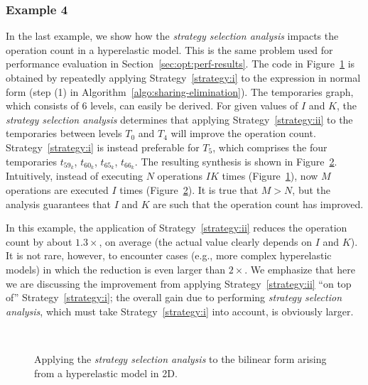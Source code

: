 \subsubsection{Example 4}
In the last example, we show how the {\em strategy selection analysis} impacts the operation count in a hyperelastic model. This is the same problem used for performance evaluation in Section~\ref{sec:opt:perf-results}. The code in Figure~\ref{code:hyper_a} is obtained by repeatedly applying Strategy~\ref{strategy:i} to the expression in normal form (step (1) in Algorithm~\ref{algo:sharing-elimination}). The temporaries graph, which consists of 6 levels, can easily be derived. For given values of $I$ and $K$, the {\em strategy selection analysis} determines that applying Strategy~\ref{strategy:ii} to the temporaries between levels $T_0$ and $T_4$ will improve the operation count. Strategy~\ref{strategy:i} is instead preferable for $T_5$, which comprises the four temporaries $t_{59_k}$, $t_{60_k}$, $t_{65_k}$, $t_{66_k}$. The resulting synthesis is shown in Figure~\ref{code:hyper_b}. Intuitively, instead of executing $N$ operations $I K$ times (Figure~\ref{code:hyper_a}), now $M$ operations are executed $I$ times (Figure~\ref{code:hyper_b}). It is true that $M > N$, but the analysis guarantees that $I$ and $K$ are such that the operation count has improved. 

In this example, the application of Strategy~\ref{strategy:ii} reduces the operation count by about $1.3 \times$, on average (the actual value clearly depends on $I$ and $K$). It is not rare, however, to encounter cases (e.g., more complex hyperelastic models) in which the reduction is even larger than $2 \times$. We emphasize that here we are discussing the improvement from applying Strategy~\ref{strategy:ii} ``on top of'' Strategy~\ref{strategy:i}; the overall gain due to performing {\em strategy selection analysis}, which must take Strategy~\ref{strategy:i} into account, is obviously larger.

\begin{figure}[htp]
\begin{CenteredBox}

\begin{subfigure}{0.55\textwidth}

\label{code:hyper_a}
\end{subfigure}
~~~~~~
\begin{subfigure}{0.65\textwidth}

\label{code:hyper_b}
\end{subfigure}

\end{CenteredBox}

\caption{Applying the {\em strategy selection analysis} to the bilinear form arising from a hyperelastic model in 2D.}
\label{code:hyperelasticity}
\end{figure}

